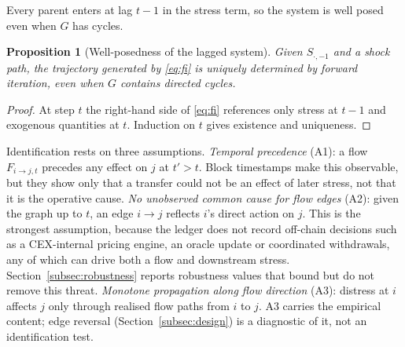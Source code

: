 \documentclass[referee,pdflatex,sn-mathphys-ay]{sn-jnl}
\theoremstyle{thmstyleone}%
\newtheorem{proposition}[theorem]{Proposition}%
\theoremstyle{thmstyletwo}%
\theoremstyle{thmstylethree}%
\begin{document}
Every parent enters at lag $t\!-\!1$ in the stress term, so the system is well posed even
when $G$ has cycles.

\begin{proposition}[Well-posedness of the lagged system]
\label{prop:wellposed}
Given $S_{\cdot,-1}$ and a shock path, the trajectory generated by \eqref{eq:fi} is
uniquely determined by forward iteration, even when $G$ contains directed cycles.
\end{proposition}
\begin{proof}
At step $t$ the right-hand side of \eqref{eq:fi} references only stress at $t\!-\!1$ and
exogenous quantities at $t$. Induction on $t$ gives existence and uniqueness.
\end{proof}

Identification rests on three assumptions. \emph{Temporal precedence} (A1): a flow
$F_{i\to j,t}$ precedes any effect on $j$ at $t'>t$. Block timestamps make this
observable, but they show only that a transfer could not be an effect of later stress, not
that it is the operative cause. \emph{No unobserved common cause for flow edges} (A2): given
the graph up to $t$, an edge $i\to j$ reflects $i$'s direct action on $j$. This is the
strongest assumption, because the ledger does not record off-chain decisions such as a
CEX-internal pricing engine, an oracle update or coordinated withdrawals, any of which can
drive both a flow and downstream stress. Section~\ref{subsec:robustness} reports robustness values that
bound but do not remove this threat. \emph{Monotone propagation along flow direction} (A3): distress
at $i$ affects $j$ only through realised flow paths from $i$ to $j$. A3 carries the
empirical content; edge reversal (Section~\ref{subsec:design}) is a diagnostic of it, not an identification test.
\end{document}
